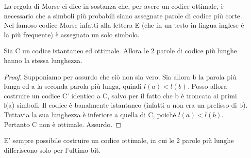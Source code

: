 La regola di Morse ci dice in sostanza che, per avere un codice ottimale, è necessario che a simboli più probabili siano assegnate 
parole di codice più corte. Nel famoso codice Morse infatti alla lettera E (che in un testo in lingua inglese è la più frequente) è assegnato un solo simbolo. 

\begin{proposizione}
 Sia C un codice istantaneo ed ottimale. Allora le 2 parole di codice più lunghe hanno la stessa lunghezza.
\begin{proof}
 Supponiamo per assurdo che ciò non sia vero. Sia allora b la parola più lunga ed a la seconda parola più lunga, quindi $l(a)<l(b)$.
 Posso allora costruire un codice C' identico a C, salvo per il fatto che b è troncata ai primi l(a) simboli.
 Il codice è banalmente istantaneo (infatti a non era un prefisso di b). Tuttavia la sua lunghezza è inferiore a quella di C, 
 poiché $l(a)<l(b)$. Pertanto C non è ottimale. Assurdo.
\end{proof}

\end{proposizione}

\begin{osservazione}
 E' sempre possibile costruire un codice ottimale, in cui le 2 parole più lunghe differiscono solo per l'ultimo bit.
\label{diff1bit}
\end{osservazione}


